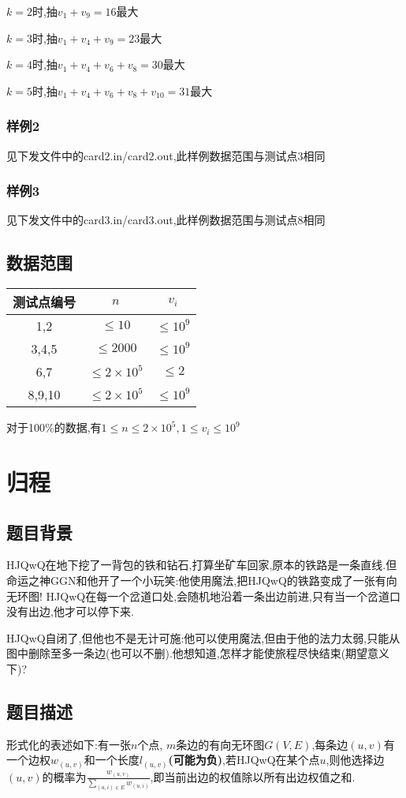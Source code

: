 \documentclass[12pt]{ctexart}
\begin{document}
$k=2$时,抽$v_1+v_9=16$最大

$k=3$时,抽$v_1+v_4+v_9=23$最大

$k=4$时,抽$v_1+v_4+v_6+v_8=30$最大

$k=5$时,抽$v_1+v_4+v_6+v_8+v_{10}=31$最大
\subsubsection{样例2}
见下发文件中的card2.in/card2.out,此样例数据范围与测试点3相同
\subsubsection{样例3}
见下发文件中的card3.in/card3.out,此样例数据范围与测试点8相同
\subsection{数据范围}
\begin{center}
	\begin{tabular}{|c|c|c|}
		\hline 测试点编号&$n$&$v_i$\\
		\hline 1,2&$\le10$&$\le10^9$\\
		\hline 3,4,5&$\le2000$&$\le10^9$\\
		\hline 6,7&$\le2\times10^5$&$\le2$\\
		\hline 8,9,10&$\le2\times10^5$&$\le10^9$\\
		\hline
	\end{tabular}
\end{center}
对于100\%的数据,有$1\le n\le2\times10^5,1\le v_i\le10^9$
\newpage
\section{归程}
\subsection{题目背景}
HJQwQ在地下挖了一背包的铁和钻石,打算坐矿车回家,原本的铁路是一条直线.但命运之神GGN和他开了一个小玩笑:他使用魔法,把HJQwQ的铁路变成了一张有向无环图! HJQwQ在每一个岔道口处,会随机地沿着一条出边前进,只有当一个岔道口没有出边,他才可以停下来.

HJQwQ自闭了,但他也不是无计可施:他可以使用魔法,但由于他的法力太弱,只能从图中删除至多一条边(也可以不删).他想知道,怎样才能使旅程尽快结束(期望意义下)?
\subsection{题目描述}
形式化的表述如下:有一张$n$个点, $m$条边的有向无环图$G(V,E)$,每条边$(u,v)$有一个边权$w_{(u,v)}$和一个长度$l_{(u,v)}$\textbf{(可能为负)},若HJQwQ在某个点$u$,则他选择边$(u,v)$的概率为$\frac{w_{(u,v)}}{\sum\limits_{(u,i)\in E}w_{(u,i)}}$,即当前出边的权值除以所有出边权值之和.
\end{document}
